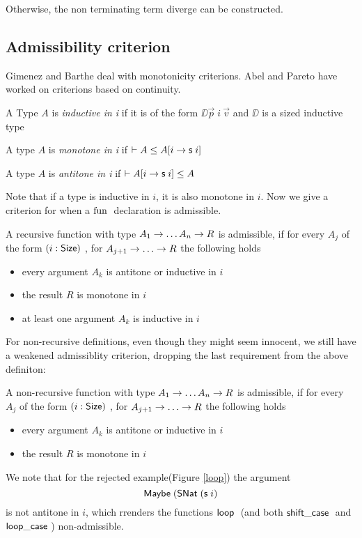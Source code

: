 Otherwise, the non terminating term diverge can be constructed.

\subsection{Admissibility criterion}
Gimenez and Barthe deal with monotonicity criterions.
Abel and Pareto have worked on criterions based on continuity.
\begin{definition}
A Type $A$ is \emph{inductive in i} if it is of the form $ \DD \vec{p} \; i \: \vec{v} $ and $\DD$ is a sized inductive type
\end{definition}
\begin{definition}
A type $A$ is \emph{monotone in i} if $ \vdash A\leq A[i \rightarrow \mathsf{s}\; i ]$ 
\end{definition}
\begin{definition}
A type $A$ is \emph{antitone in i} if $ \vdash A[i \rightarrow \mathsf{s}\; i ]\leq A$ 
\end{definition}
Note that if a type is inductive in $i$, it is also monotone in $i$. 
Now we give a criterion for when a $\mathrm{fun}\;$ declaration is admissible.
\begin{definition}
A recursive function with type $ A_1 \rightarrow \dots A_n \rightarrow R $ is admissible, if
for every $A_j$ of the form $(i : \mathsf{Size} )$ , for $A_{j + 1} \ra \dots \ra R $ the following holds 
\begin{itemize}
\item
every argument $A_k$ is antitone or inductive in $i$
\item
the result $R$ is monotone in $i$  
\item
at least one argument $A_k$ is inductive in $i$
\end{itemize}
\end{definition}
For non-recursive definitions, even though they might seem innocent,
we still have a weakened admissiblity criterion, dropping the last requirement from the above definiton:
\begin{definition}
A non-recursive function with type $ A_1 \rightarrow \dots A_n \rightarrow R $ is admissible, if
for every $A_j$ of the form $(i : \mathsf{Size} )$ , for $A_{j + 1} \ra \dots \ra R $ the following holds 
\begin{itemize}
\item
every argument $A_k$ is antitone or inductive in $i$
\item
the result $R$ is monotone in $i$  
\end{itemize}
\end{definition}
We note that for the rejected example(Figure \ref{loop}) the argument \[\mathsf{Maybe}\; (\mathsf{SNat}\; (\mathsf{s}\; i)\] is not antitone in $i$, which rrenders the functions $\mathsf{loop}\;$ (and both $ \mathsf{shift\_case}\;$ and $\mathsf{loop\_case}\;$) non-admissible.
